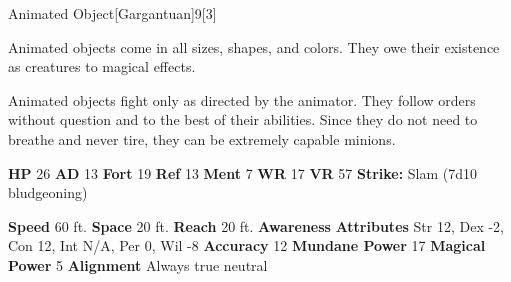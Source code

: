   
  \begin{monsection}{Animated Object}[Gargantuan]{9}[3]
    \vspace{-1em}\vspace{-1em}
    \vspace{0em}

    
    Animated objects come in all sizes, shapes, and colors. They owe their existence as creatures to magical effects.

    Animated objects fight only as directed by the animator. They follow orders without question and to the best of their abilities. Since they do not need to breathe and never tire, they can be extremely capable minions.
  
    

    \begin{spellcontent}
      \begin{spelltargetinginfo}
        \pari \textbf{HP} 26 \monsep
          \textbf{AD} 13 \monsep
          \textbf{Fort} 19 \monsep
          \textbf{Ref} 13 \monsep
          \textbf{Ment} 7
        \pari \textbf{WR} 17 \monsep
        \textbf{VR} 57
        \pari \textbf{Strike:}
            Slam  (7d10 bludgeoning)
      \end{spelltargetinginfo}
    \end{spellcontent}
    \begin{monsterfooter}
      \pari \textbf{Speed} 60 ft. \monsep
        \textbf{Space} 20 ft. \monsep
        \textbf{Reach} 20 ft.
      \pari \textbf{Awareness} 
      \pari \textbf{Attributes}
        Str 12, Dex -2,
        Con 12, Int N/A,
        Per 0, Wil -8
      \pari \textbf{Accuracy} 12 \monsep
        \textbf{Mundane Power} 17 \monsep
      \textbf{Magical Power} 5
      \pari \textbf{Alignment} Always true neutral
    \end{monsterfooter}
  \end{monsection}
  
